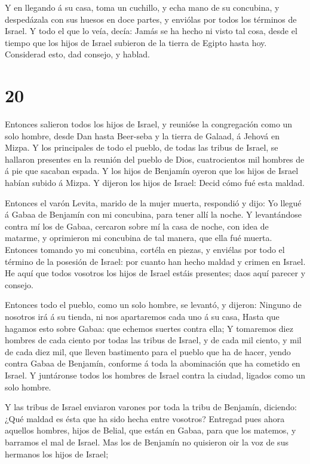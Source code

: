  Y en llegando á su casa, toma un cuchillo, y echa mano de
su concubina, y despedázala con sus huesos en doce partes, y enviólas
por todos los términos de Israel.  Y todo el que lo veía,
decía: Jamás se ha hecho ni visto tal cosa, desde el tiempo que los
hijos de Israel subieron de la tierra de Egipto hasta hoy. Considerad
esto, dad consejo, y hablad.

\hypertarget{section-19}{%
\section{20}\label{section-19}}

 Entonces salieron todos los hijos de Israel, y reunióse la
congregación como un solo hombre, desde Dan hasta Beer-seba y la tierra
de Galaad, á Jehová en Mizpa.  Y los principales de todo el
pueblo, de todas las tribus de Israel, se hallaron presentes en la
reunión del pueblo de Dios, cuatrocientos mil hombres de á pie que
sacaban espada.  Y los hijos de Benjamín oyeron que los
hijos de Israel habían subido á Mizpa. Y dijeron los hijos de Israel:
Decid cómo fué esta maldad.

 Entonces el varón Levita, marido de la mujer muerta,
respondió y dijo: Yo llegué á Gabaa de Benjamín con mi concubina, para
tener allí la noche.  Y levantándose contra mí los de Gabaa,
cercaron sobre mí la casa de noche, con idea de matarme, y oprimieron mi
concubina de tal manera, que ella fué muerta.  Entonces
tomando yo mi concubina, cortéla en piezas, y enviélas por todo el
término de la posesión de Israel: por cuanto han hecho maldad y crimen
en Israel.  He aquí que todos vosotros los hijos de Israel
estáis presentes; daos aquí parecer y consejo.

 Entonces todo el pueblo, como un solo hombre, se levantó, y
dijeron: Ninguno de nosotros irá á su tienda, ni nos apartaremos cada
uno á su casa,  Hasta que hagamos esto sobre Gabaa: que
echemos suertes contra ella;  Y tomaremos diez hombres de
cada ciento por todas las tribus de Israel, y de cada mil ciento, y mil
de cada diez mil, que lleven bastimento para el pueblo que ha de hacer,
yendo contra Gabaa de Benjamín, conforme á toda la abominación que ha
cometido en Israel.  Y juntáronse todos los hombres de
Israel contra la ciudad, ligados como un solo hombre.

 Y las tribus de Israel enviaron varones por toda la tribu
de Benjamín, diciendo: ¿Qué maldad es ésta que ha sido hecha entre
vosotros?  Entregad pues ahora aquellos hombres, hijos de
Belial, que están en Gabaa, para que los matemos, y barramos el mal de
Israel. Mas los de Benjamín no quisieron oir la voz de sus hermanos los
hijos de Israel;

